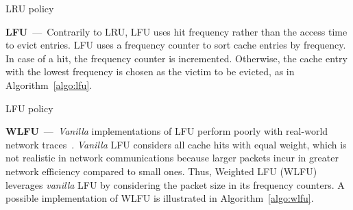 \begin{algorithm}[]
	\caption{LRU policy}
	\label{algo:lru}
	\SetInd{0.1em}{.9em}
	\SetAlgoLined
	\footnotesize
\end{algorithm}

\textbf{LFU}~---~Contrarily to LRU, LFU uses hit frequency rather than the access time to evict entries.
LFU uses a frequency counter to sort cache entries by frequency.
In case of a hit, the frequency counter is incremented.
Otherwise, the cache entry with the lowest frequency is chosen as the victim to be evicted, as in Algorithm~\ref{algo:lfu}.

\begin{algorithm}[]
	\caption{LFU policy}
	\label{algo:lfu}
	\SetInd{0.1em}{.9em}
	\SetAlgoLined
	\footnotesize
\end{algorithm}

\textbf{WLFU}~---~\textit{Vanilla} implementations of LFU perform poorly with real-world network traces~\cite{Kim:09}.
\textit{Vanilla} LFU considers all cache hits with equal weight, which is not realistic in network communications because larger packets incur in greater network efficiency compared to small ones.
Thus, Weighted LFU (WLFU) leverages \textit{vanilla} LFU by considering the packet size in its frequency counters.
A possible implementation of WLFU is illustrated in Algorithm~\ref{algo:wlfu}.

